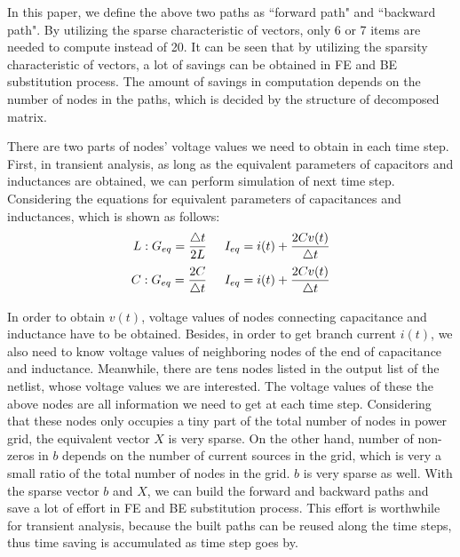 In this paper, we define the above two paths as ``forward path" and ``backward path". By utilizing the sparse characteristic of vectors,
only 6 or 7 items are needed to compute instead of 20. It can be seen that by utilizing the sparsity characteristic of vectors, a lot of
savings can be obtained in FE and BE substitution process. The amount of savings in computation depends on the number of nodes in the 
paths, which is decided by the structure of decomposed matrix. 
 
There are two parts of nodes' voltage values we need to obtain in each time step. First, in transient analysis, as long as the equivalent parameters of capacitors and inductances are obtained, we can perform 
simulation of next time step. Considering the equations for equivalent parameters of capacitances and inductances, which is shown as follows:
\begin{align}
	L: G_{eq}=\frac{\triangle t}{2L}\hspace{5mm} I_{eq}=i(t)+\frac{2Cv(t)}{\triangle t}\\
	C: G_{eq}=\frac{2C}{\triangle t} \hspace{5mm} I_{eq}=i(t)+\frac{2Cv(t)}{\triangle t}
\end{align}

In order to obtain $v(t)$, voltage values of nodes connecting capacitance and inductance have to be obtained. Besides, in order to get branch current $i(t)$, we also need to know voltage values of neighboring nodes of the end of capacitance and inductance. Meanwhile, there are tens nodes listed in the output list of the netlist, whose voltage values we are interested. The voltage values of
these the above nodes are all information we need to get at each time step. Considering that these nodes only occupies a
tiny part of the total number of nodes in power grid, the equivalent
vector $X$ is very sparse. On the other hand, number of non-zeros in $b$ depends on the number of current sources in the grid, which is 
very a small ratio of the total number of nodes in the grid. $b$ is very sparse as well. With the sparse vector $b$ and $X$, we can build 
the forward and backward paths and save a lot of effort in FE and BE substitution process. This effort is worthwhile for transient 
analysis, because the built paths can be reused along the time steps, thus time saving is accumulated as time step goes by.

